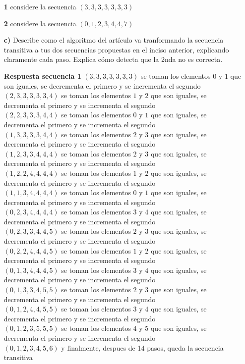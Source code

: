 \documentclass[12pt]{article}
\begin{document}
\begin{itemize}
  \item[\bf{1}]
    considere la secuencia $(3,3,3,3,3,3,3)$

  \item[\bf{2}]
    considere la secuencia $(0,1,2,3,4,4,7)$

  \item[\bf{c)}] Describe como el algoritmo del artículo va tranformando la secuencia transitiva a tus dos secuencias propuestas en el inciso anterior, explicando claramente cada paso. Explica cómo detecta que la 2nda no es correcta.

  \item[\bf{Respuesta secuencia 1}]
    $(3,3,3,3,3,3,3)$
    se toman los elementos $0$ y $1$ que son iguales, se decrementa el primero y se incrementa el segundo\\
    $(2,3,3,3,3,3,4)$
    se toman los elementos $1$ y $2$ que son iguales, se decrementa el primero y se incrementa el segundo\\
    $(2,2,3,3,3,4,4)$
    se toman los elementos $0$ y $1$ que son iguales, se decrementa el primero y se incrementa el segundo\\
    $(1,3,3,3,3,4,4)$
    se toman los elementos $2$ y $3$ que son iguales, se decrementa el primero y se incrementa el segundo\\
    $(1,2,3,3,4,4,4)$
    se toman los elementos $2$ y $3$ que son iguales, se decrementa el primero y se incrementa el segundo\\
    $(1,2,2,4,4,4,4)$
    se toman los elementos $1$ y $2$ que son iguales, se decrementa el primero y se incrementa el segundo\\
    $(1,1,3,4,4,4,4)$
    se toman los elementos $0$ y $1$ que son iguales, se decrementa el primero y se incrementa el segundo\\
    $(0,2,3,4,4,4,4)$
    se toman los elementos $3$ y $4$ que son iguales, se decrementa el primero y se incrementa el segundo\\
    $(0,2,3,3,4,4,5)$
    se toman los elementos $2$ y $3$ que son iguales, se decrementa el primero y se incrementa el segundo\\
    $(0,2,2,4,4,4,5)$
    se toman los elementos $1$ y $2$ que son iguales, se decrementa el primero y se incrementa el segundo\\
    $(0,1,3,4,4,4,5)$
    se toman los elementos $3$ y $4$ que son iguales, se decrementa el primero y se incrementa el segundo\\
    $(0,1,3,3,4,5,5)$
    se toman los elementos $2$ y $3$ que son iguales, se decrementa el primero y se incrementa el segundo\\
    $(0,1,2,4,4,5,5)$
    se toman los elementos $3$ y $4$ que son iguales, se decrementa el primero y se incrementa el segundo\\
    $(0,1,2,3,5,5,5)$
    se toman los elementos $4$ y $5$ que son iguales, se decrementa el primero y se incrementa el segundo\\
    $(0,1,2,3,4,5,6)$
    y finalmente, despues de 14 pasos, queda la secuencia transitiva 


\end{itemize}
\end{document}

